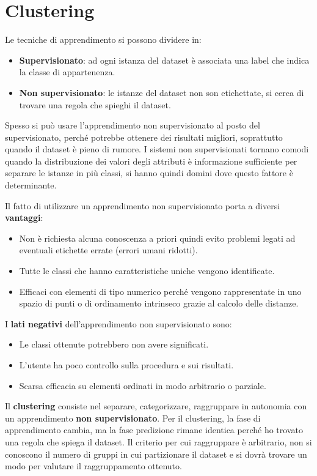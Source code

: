 \chapter{Clustering}
Le tecniche di apprendimento si possono dividere in:
\begin{itemize}
      \item \textbf{Supervisionato}: ad ogni istanza del dataset è associata una
            label che indica la classe di appartenenza.
      \item \textbf{Non supervisionato}: le istanze del dataset non son etichettate,
            si cerca di trovare una regola che spieghi il dataset.
\end{itemize}
Spesso si può usare l'apprendimento non supervisionato al posto del supervisionato,
perché potrebbe ottenere dei risultati migliori, soprattutto quando il dataset è
pieno di rumore. I sistemi non supervisionati tornano comodi quando la distribuzione
dei valori degli attributi è informazione sufficiente per separare le istanze in
più classi, si hanno quindi domini dove questo fattore è determinante.

Il fatto di utilizzare un apprendimento non supervisionato porta a diversi
\textbf{vantaggi}:
\begin{itemize}
      \item Non è richiesta alcuna conoscenza a priori quindi evito problemi legati
            ad eventuali etichette errate (errori umani ridotti).
      \item Tutte le classi che hanno caratteristiche uniche vengono identificate.
      \item Efficaci con elementi di tipo numerico perché vengono rappresentate in
            uno spazio di punti o di ordinamento intrinseco grazie al calcolo delle
            distanze.
\end{itemize}
I \textbf{lati negativi} dell'apprendimento non supervisionato sono:
\begin{itemize}
      \item Le classi ottenute potrebbero non avere significati.
      \item L'utente ha poco controllo sulla procedura e sui risultati.
      \item Scarsa efficacia su elementi ordinati in modo arbitrario o parziale.
\end{itemize}
Il \textbf{clustering} consiste nel  separare, categorizzare, raggruppare in
autonomia con un apprendimento \textbf{non supervisionato}.
Per il clustering, la fase di apprendimento cambia, ma la fase predizione rimane
identica perché ho trovato una regola che spiega il dataset. Il criterio per cui
raggruppare è arbitrario, non si conoscono il numero di gruppi in cui partizionare
il dataset e si dovrà trovare un modo per valutare il raggruppamento ottenuto.

